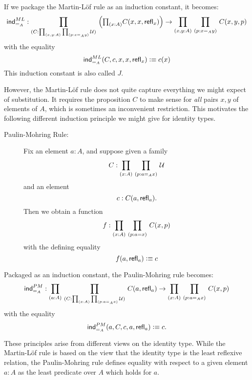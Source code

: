If we package the Martin-L\"of rule as an induction constant, it becomes:
\begin{align*}
 \ind{=_A}^{ML} :  \dprd{C : \prd{x,y:A}{p:x =_A y} \UU} 
     \Big(\tprd{x:A} C(x,x,\refl{x})\Big) \to  \dprd{x,y:A}{p:x =_A y} C(x,y,p)
\end{align*}
with the equality
\[ \mathsf{ind}_{=_A}^{ML}(C,c,x,x,\mathsf{refl}_{x}) \vcentcolon\equiv c(x) \]
This induction constant is also called $J$.

However, the Martin-L\"of rule does not quite capture everything we might expect of substitution.
It requires the proposition $C$ to make sense for \emph{all} pairs $x,y$ of elements of $A$, which is sometimes an inconvenient restriction.
This motivates the following different induction principle we might give for identity types.

\begin{description}
\item[Paulin-Mohring Rule:] 
Fix an element $a:A$, and suppose given a family
\[ C : \prd{x:A}{p : a =_A x} \UU \]
and an element
\[ c : C(a,\mathsf{refl}_{a}). \]
Then we obtain a function
\[ f : \prd{x:A}{p:a = x} C(x,p) \]
with the defining equality
\[ f(a,\mathsf{refl}_{a}) \vcentcolon\equiv c \]
\end{description}

Packaged as an induction constant, the Paulin-Mohring rule becomes:
\begin{align*}
\ind{=_A}^{PM} :  \dprd{a:A}{C : \prd{x:A}{p : a =_A x} \UU}
 C(a,\refl{a}) \to \dprd{x:A}{p : a =_A x} C(x,p) 
\end{align*}
with the equality
\[ \mathsf{ind}_{=_A}^{PM}(a,C,c,a,\mathsf{refl}_{a}) \vcentcolon\equiv c. \]

These principles arise from different views on the identity type.
While the Martin-L\"of rule is based on the view that the identity
type is the least reflexive relation, the Paulin-Mohring rule defines 
equality with respect to a given element $a:A$ as the least predicate
over $A$ which holds for $a$.

